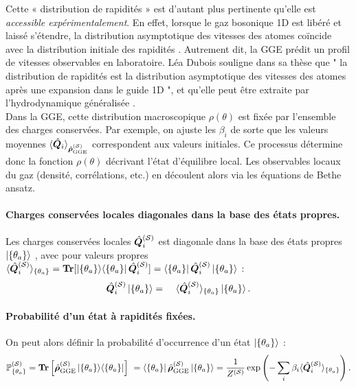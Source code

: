 Cette « distribution de rapidités » est d’autant plus pertinente qu’elle est {\em accessible expérimentalement}. En effet, lorsque le gaz bosonique 1D est libéré et laissé s’étendre, la distribution asymptotique des vitesses des atomes coïncide avec la distribution initiale des rapidités \cite{??} . Autrement dit, la GGE prédit un profil de vitesses observables en laboratoire. Léa Dubois souligne dans sa thèse que " la distribution de rapidités est la distribution asymptotique des vitesses des atomes après une expansion dans le guide 1D ", et qu’elle peut être extraite par l’hydrodynamique généralisée \cite{??}. \\

Dans la GGE, cette distribution macroscopique $\rho(\theta)$ est fixée par l’ensemble des charges conservées. Par exemple, on ajuste les $\beta_i$ de sorte que les valeurs moyennes $\langle \hat{\bm{Q}}_i \rangle_{\hat{\bm{\rho}}^{(\mathcal{S})}_{\mathrm{GGE}}}$ correspondent aux valeurs initiales. Ce processus détermine donc la fonction $\rho(\theta)$ décrivant l’état d’équilibre local. Les observables locaux du gaz (densité, corrélations, etc.) en découlent alors via les équations de Bethe ansatz. 

\paragraph{Charges conservées locales diagonales dans la base des états propres.}
Les charges conservées locales $\hat{\bm{Q}}_i^{(\mathcal{S})}$ est diagonale dans la base des  états propres $\ket{ \{ \theta_a \}}$ , avec pour valeurs propres $\langle \hat{\bm{Q}}_i^{(\mathcal{S})} \rangle_{\{\theta_a \}} = \bm{\mathrm{Tr}}[\ket{\{\theta_a \}}\!\bra{\{\theta_a \}} \hat{\bm{Q}}_i^{(\mathcal{S})}] =  \bra{\{\theta_a \}} \hat{\bm{Q}}_i^{(\mathcal{S})} \ket{\{\theta_a \}}$ :
\begin{eqnarray}
	\operator{Q}_i^{(\mathcal{S})}\ket{\{\theta_a \}} & = &  \langle \operator{Q}_i^{(\mathcal{S})} \rangle_{\{\theta_a \}}  \ket{\{\theta_a \}}.		
\end{eqnarray}
\paragraph{Probabilité d’un état à rapidités fixées.}
On peut alors définir la probabilité d’occurrence d’un état $\ket{\{ \theta_a \} }$ :
\begin{eqnarray}
	\mathbb{P}^{(\mathcal{S})}_{\{ \theta_a \}}  =  \bm{\mathrm{Tr}} \left [\operator{\rho}^{(\mathcal{S})}_{\mathrm{GGE}} \ket{\{\theta_a \}}\!\bra{\{\theta_a \}} \right ] =  \bra{\{\theta_a \}}	\operator{\rho}^{(\mathcal{S})}_{\mathrm{GGE}} \ket{\{\theta_a \}}  = \frac{1}{Z^{(\mathcal{S})}} \exp \left (- \sum_i \beta_i \langle \operator{Q}_i^{(\mathcal{S})} \rangle_{\{\theta_a \}} \right ) .
\end{eqnarray}

